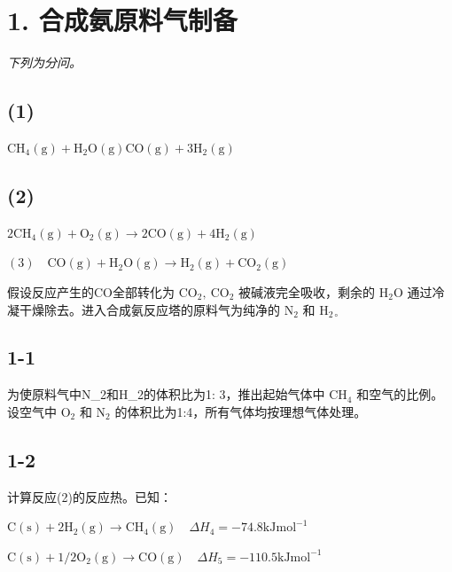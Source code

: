 \section*{1. 合成氨原料气制备}
\textit{下列为分问。}

\subsection*{(1)}
$\mathrm { C H _ { 4 } ( g ) + H _ { 2 } O ( g )  C O ( g ) + 3 H _ { 2 } ( g ) }$

\subsection*{(2)}
$2 \mathrm { C H } _ { 4 } ( \mathrm { g } ) + \mathrm { O } _ { 2 } ( \mathrm { g } ) \to 2 \mathrm { C O } ( \mathrm { g } ) + 4 \mathrm { H } _ { 2 } ( \mathrm { g } )$

$
(3) \quad \mathrm{CO} (\mathrm{g}) + \mathrm{H} _ {2} \mathrm{O} (\mathrm{g}) \rightarrow \mathrm{H} _ {2} (\mathrm{g}) + \mathrm{CO} _ {2} (\mathrm{g})
$

假设反应产⽣的CO全部转化为 $\mathrm { C O _ { 2 } , \ C O _ { 2 } }$ 被碱液完全吸收，剩余的 $\mathrm { H _ { 2 } O }$ 通过冷凝⼲燥除去。进⼊合成氨反应塔的原料⽓为纯净的 $\mathrm { N } _ { 2 }$ 和 $\mathrm { H } _ { 2 \circ }$

\subsection*{1-1}
为使原料⽓中N_{2}和H_{2}的体积⽐为1: 3，推出起始⽓体中 $\mathrm { C H _ { 4 } }$ 和空⽓的⽐例。设空⽓中 $\mathrm { O _ { 2 } }$ 和 $\mathrm { N } _ { 2 }$ 的体积⽐为1:4，所有⽓体均按理想⽓体处理。

\subsection*{1-2}
计算反应(2)的反应热。已知：

$
\mathrm{C} (\mathrm{s}) + 2 \mathrm{H} _ {2} (\mathrm{g}) \rightarrow \mathrm{CH} _ {4} (\mathrm{g}) \quad \Delta H _ {4} = - 7 4. 8 \mathrm{kJ} \mathrm{mol} ^ {- 1} \tag {4}
$

$
\mathrm{C} (\mathrm{s}) + 1 / 2 \mathrm{O} _ {2} (\mathrm{g}) \rightarrow \mathrm{CO} (\mathrm{g}) \quad \Delta H _ {5} = - 1 1 0. 5 \mathrm{kJ} \mathrm{mol} ^ {- 1} \tag {5}
$
